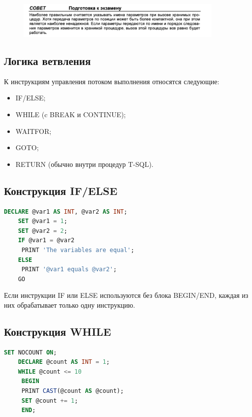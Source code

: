 \begin{figure}[h!]
	\begin{center}
		\includegraphics[width=0.9\textwidth]{img/advice36.png}
	\end{center}
	\captionsetup{justification=centering}
\end{figure}


\subsection{Логика ветвления}

К инструкциям управления потоком выполнения относятся следующие: 

\begin{itemize}
	\item IF/ELSE; 
	\item WHILE (c BREAK и CONTINUE); 
	\item WAITFOR; 
	\item GOTO; 
	\item RETURN (обычно внутри процедур T-SQL). 
\end{itemize}


\subsection{Конструкция IF/ELSE}

\begin{lstlisting}[label=lst:funcReturn, language=sql]
	DECLARE @var1 AS INT, @var2 AS INT;
	SET @var1 = 1;
	SET @var2 = 2;
	IF @var1 = @var2
	 PRINT 'The variables are equal';
	ELSE
	 PRINT '@var1 equals @var2';
	GO 
\end{lstlisting}


Если инструкции IF или ELSE используются без блока BEGIN/END, каждая из них обрабатывает только одну инструкцию.

\subsection{Конструкция WHILE}


\begin{lstlisting}[label=lst:funcReturn, language=sql]
	SET NOCOUNT ON;
	DECLARE @count AS INT = 1;
	WHILE @count <= 10
	 BEGIN
	 PRINT CAST(@count AS @count);
	 SET @count += 1;
	 END; 
\end{lstlisting}


